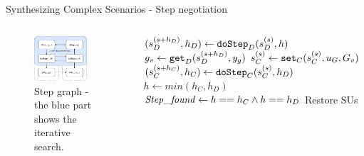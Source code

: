 \documentclass{beamer}
\begin{document}
\begin{frame}{Synthesizing Complex Scenarios - Step negotiation}
    \begin{columns}[T] 
        \begin{column}{.48\textwidth}
            \begin{figure}    
                \includegraphics[width=0.8\textwidth]{images/step_scenario_graph.pdf}
                \caption{Step graph - the blue part shows the iterative search.}
            \end{figure}  
        \end{column}
    \hfill%
    \begin{column}{.48\textwidth}
        \begin{algorithm}[H]
            \caption{Step negotiation.}
        \begin{algorithmic}[1]
          \scriptsize
            \While{$!\stepfound$} 
            \State $(s_{D}^{(s+h_D)},h_D) \gets \mathtt{doStep}_{D}(s_{D}^{(s)}, h)$
            \State $g_v \gets \mathtt{get}_{D}(s_{D}^{(s+h_D)}, y_{g})$       
            \State $s_{C}^{(s)} \gets \mathtt{set}_{C}(s_{C}^{(s)}, u_{G}, G_v)$
            \State $(s_{C}^{(s+h_C)},h_C) \gets \mathtt{doStep}_{C}(s_{C}^{(s)}, h_D)$
            \State $h \gets min(h_C, h_D)$
            \State $\mathit{Step\_found} \gets h == h_C \land h == h_D$
            \If{$!\stepfound$}
                \State Restore SUs
            \EndIf
            \EndWhile
        \end{algorithmic} 
      \end{algorithm}
    \end{column}
    \end{columns}
\end{frame}
\end{document}

